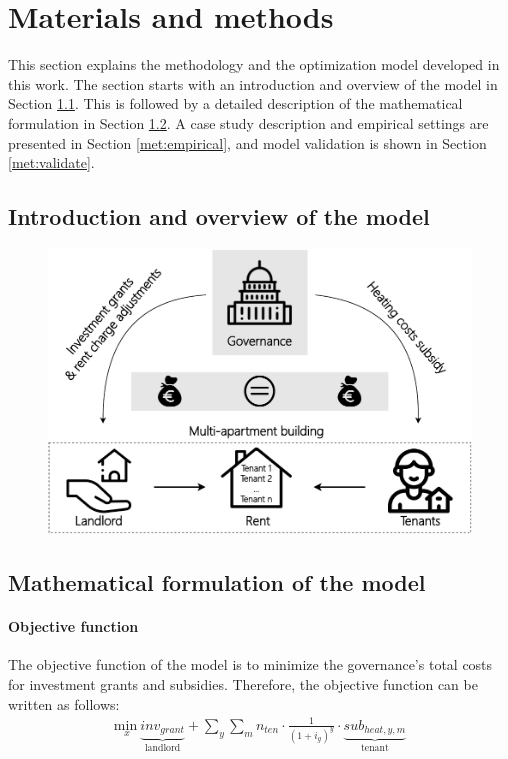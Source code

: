 \newpage
\section{Materials and methods}\label{methodology}
This section explains the methodology and the optimization model developed in this work. The section starts with an introduction and overview of the model in Section \ref{met:intro}. This is followed by a detailed description of the mathematical formulation in Section \ref{met:formulas}. A case study description and empirical settings are presented in Section \ref{met:empirical}, and model validation is shown in Section \ref{met:validate}.

\subsection{Introduction and overview of the model}\label{met:intro}

\begin{figure}[h]
	\centering
	\includegraphics[width=0.9\linewidth]{figures/3_Methodology/Sketch.pdf}
	\caption{}
	\label{fig:methodology}
\end{figure}





\subsection{Mathematical formulation of the model}\label{met:formulas}

\paragraph{Objective function}
The objective function of the model is to minimize the governance's total costs for investment grants and subsidies. Therefore, the objective function can be written as follows: 
\begin{align}\label{objective}
\underset{x}{\mathrm{min~}} \underbrace{inv_{grant}}_\text{landlord} + \sum_{y} \sum_{m} n_{ten} \cdot \frac{1}{(1+i_g)^y} \cdot \underbrace{sub_{heat,y,m}}_\text{tenant}
\end{align}

